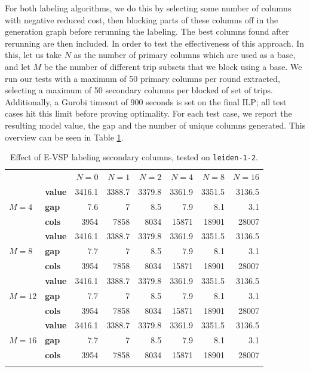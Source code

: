 \documentclass[]{article}
\begin{document}
For both labeling algorithms, we do this by selecting some number of columns with negative reduced cost, then blocking parts of these columns off in the generation graph before rerunning the labeling. The best columns found after rerunning are then included. In order to test the effectiveness of this approach. In this, let us take $N$ as the number of primary columns which are used as a base, and let $M$ be the number of different trip subsets that we block using a base. We run our tests with a maximum of 50 primary columns per round extracted, selecting a maximum of 50 secondary columns per blocked of set of trips. Additionally, a Gurobi timeout of 900 seconds is set on the final ILP; all test cases hit this limit before proving optimality. For each test case, we report the resulting model value, the gap and the number of unique columns generated. This overview can be seen in Table \ref{tab:evsp-secondary-columns}. 

\begin{table}[h]
  \centering
  \begin{tabular}{llrrrrrr}
    \toprule
    && $N=0$ & $N=1$ & $N=2$ & $N=4$ & $N=8$ & $N=16$ \\
    \arrayrulecolor{black!30}\cmidrule(lr){1-8}
    \addlinespace[0.4em]
     & \textbf{value}  & 3416.1 & 3388.7 & 3379.8 & 3361.9 & 3351.5 & 3136.5 \\
    $M=4$ & \textbf{gap}   & 7.6 & 7 & 8.5 & 7.9 & 8.1 & 3.1 \\
    & \textbf{cols} & 3954 & 7858 & 8034 & 15871 & 18901 & 28007 \\
    \arrayrulecolor{black!30}\cmidrule(lr){1-8}
    & \textbf{value}  & 3416.1 & 3388.7 & 3379.8 & 3361.9 & 3351.5 & 3136.5 \\
    $M=8$ & \textbf{gap}   & 7.7 & 7 & 8.5 & 7.9 & 8.1 & 3.1 \\
    & \textbf{cols} & 3954 & 7858 & 8034 & 15871 & 18901 & 28007 \\
    \arrayrulecolor{black!30}\cmidrule(lr){1-8}
    & \textbf{value}  & 3416.1 & 3388.7 & 3379.8 & 3361.9 & 3351.5 & 3136.5 \\
    $M=12$ & \textbf{gap}   & 7.7 & 7 & 8.5 & 7.9 & 8.1 & 3.1 \\
    & \textbf{cols} & 3954 & 7858 & 8034 & 15871 & 18901 & 28007 \\
    \arrayrulecolor{black!30}\cmidrule(lr){1-8}
    & \textbf{value}  & 3416.1 & 3388.7 & 3379.8 & 3361.9 & 3351.5 & 3136.5 \\
    $M=16$ & \textbf{gap}   & 7.7 & 7 & 8.5 & 7.9 & 8.1 & 3.1 \\
    & \textbf{cols} & 3954 & 7858 & 8034 & 15871 & 18901 & 28007 \\
    \arrayrulecolor{black}\bottomrule
  \end{tabular}
  \caption{Effect of E-VSP labeling secondary columns, tested on \texttt{leiden-1-2}.}
  \label{tab:evsp-secondary-columns}
\end{table}
\end{document}
